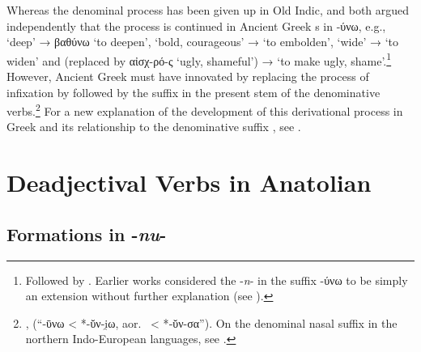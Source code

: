 \documentclass[output=paper,colorlinks,citecolor=brown]{langscibook}
\begin{document}
Whereas the denominal process has been given up in Old Indic, \citet{Koch1978} and \citet[22--28]{Tucker1981}  both argued independently that the process is continued in Ancient Greek s in -ύνω, e.g.,  ‘deep’ → βαθύνω ‘to deepen’,  ‘bold, courageous’ →  ‘to embolden’,  ‘wide’ →  ‘to widen’ and  (replaced by αἰσχ-ρό-ς ‘ugly, shameful’) →  ‘to make ugly, shame’.\footnote{Followed by \citealt{VillanuevaSvensson2024}. Earlier works considered the -\textit{n}- in the suffix -ύνω to be simply an extension without further explanation (see \citealt[264]{Palmer1980}).} However, Ancient Greek must have innovated by replacing the process of infixation by  followed by the suffix   in the present stem of the  denominative verbs.\footnote{\citealt[276--277]{Chantraine1947}, \citealt[25]{Lamberterie1990} (“-ῡνω < *-ῠν-i̯ω, aor.\  < *‑ῠν-σα”). On the denominal nasal suffix  in the northern Indo-European languages, see \citealt{VillanuevaSvensson2016}.} For a new explanation of the development of this derivational process in Greek and its relationship to the denominative suffix , see \citealt{VillanuevaSvensson2024}.

\section{Deadjectival Verbs in Anatolian}
\subsection{Formations in -\textit{nu}-}
\label{sec:nu}
\end{document}
